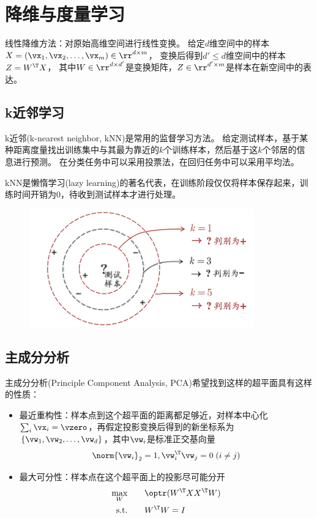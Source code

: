 
\section{降维与度量学习}
线性降维方法：对原始高维空间进行线性变换。
给定$d$维空间中的样本$X=(\vx_1,\vx_2,\ldots,\vx_m)\in\rr^{d\times m}$，
变换后得到$d'\leq d$维空间中的样本$Z=W^\T X$，
其中$W\in\rr^{d\times d'}$是变换矩阵，$Z\in\rr^{d'\times m}$是样本在新空间中的表达。

\subsection{k近邻学习}
k近邻(k-nearest neighbor, kNN)是常用的监督学习方法。
给定测试样本，基于某种距离度量找出训练集中与其最为靠近的$k$个训练样本，然后基于这$k$个邻居的信息进行预测。
在分类任务中可以采用投票法，在回归任务中可以采用平均法。

kNN是懒惰学习(lazy learning)的著名代表，在训练阶段仅仅将样本保存起来，训练时间开销为0，待收到测试样本才进行处理。
\begin{figure}[H]
\centering
\includegraphics[width=0.4\linewidth]{fig/kNN.png}
\end{figure}

\subsection{主成分分析}
主成分分析(Principle Component Analysis, PCA)希望找到这样的超平面具有这样的性质：
\begin{itemize}
	\item 最近重构性：样本点到这个超平面的距离都足够近，对样本中心化$\sum_i\vx_i=\vzero$，再假定投影变换后得到的新坐标系为$\{\vw_1,\vw_2,\ldots,\vw_d\}$，其中$\vw_i$是标准正交基向量
	\[\norm{\vw_i}_2=1,\vw_i^\T\vw_j=0\;(i\ne j)\]
	\item 最大可分性：样本点在这个超平面上的投影尽可能分开
	\[\begin{aligned}
	\max_{W} &\qquad \optr(W^\T XX^\T W)\\
	\text{s.t.} &\qquad W^\T W=I
	\end{aligned}\]
\end{itemize}

